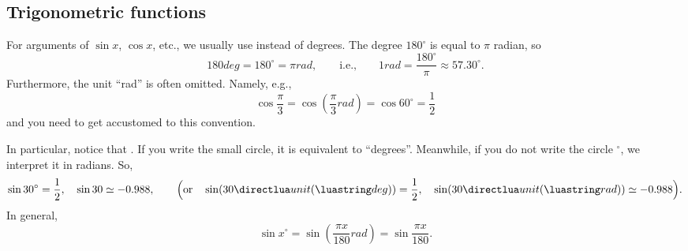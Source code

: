 \documentclass[11pt,pdfa,lastpage]{MishoNote}
\begin{document}
\begin{problems}
\end{problems}

\subsection{Trigonometric functions}
For arguments of  $\sin x$, $\cos x$, etc., we usually use  instead of degrees. The degree $180^\circ$ is equal to $\pi$ radian, so
\begin{equation*}
  180\unit{deg} = 180^\circ = \pi\unit{rad},\qquad\text{i.e.,}\qquad 1\unit{rad}=\frac{180^\circ}\pi\approx57.30^\circ.
\end{equation*}
Furthermore, the unit ``rad'' is often omitted. Namely, e.g.,
\begin{equation*}
  \cos\frac{\pi}{3} = \cos\left(\frac\pi3\unit{rad}\right) = \cos60^\circ = \frac12
\end{equation*}
and you need to get accustomed to this convention.

In particular, notice that . If you write the small circle, it is equivalent to ``degrees''. Meanwhile, if you do not write the circle $^\circ$, we interpret it in radians. So,
\[
\sin30^\circ = \frac12,\quad \sin30 \simeq -0.988,\qquad
\Bigl(\text{or}\quad
\sin(30\unit{deg}) = \frac12,\quad\sin(30\unit{rad}) \simeq -0.988\Bigr).
\]
In general,
\begin{equation}
 \sin x^\circ=\sin\left(\frac{\pi x}{180}\unit{rad}\right)=\sin\frac{\pi x}{180}.
 \end{equation}
\end{document}
